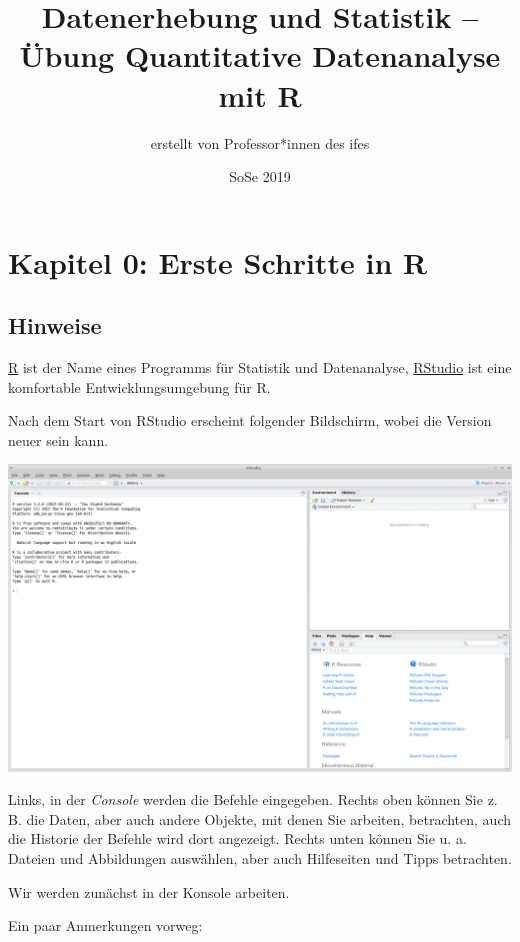 \documentclass[12pt,ngerman,paper=a4,pagesize,DIV=13]{scrreprt}
\title{Datenerhebung und Statistik -- \newline Übung Quantitative Datenanalyse
mit R}
\author{erstellt von Professor*innen des ifes}
\date{SoSe 2019}
\begin{document}
\maketitle

\tableofcontents
\newpage

\hypertarget{kapitel-0-erste-schritte-in-r}{%
\chapter{Kapitel 0: Erste Schritte in
R}\label{kapitel-0-erste-schritte-in-r}}

\hypertarget{hinweise}{%
\section{Hinweise}\label{hinweise}}

\href{https://cran.r-project.org}{R} ist der Name eines Programms für
Statistik und Datenanalyse, \href{https://www.rstudio.com}{RStudio} ist
eine komfortable Entwicklungsumgebung für R.

Nach dem Start von RStudio erscheint folgender Bildschirm, wobei die
Version neuer sein kann.

\begin{center}\includegraphics[width=0.8\linewidth]{Inhalte/images/RStudio-Screenshot-3-4} \end{center}

Links, in der \emph{Console} werden die Befehle eingegeben. Rechts oben
können Sie z. B. die Daten, aber auch andere Objekte, mit denen Sie
arbeiten, betrachten, auch die Historie der Befehle wird dort angezeigt.
Rechts unten können Sie u. a. Dateien und Abbildungen auswählen, aber
auch Hilfeseiten und Tipps betrachten.

Wir werden zunächst in der Konsole arbeiten.

Ein paar Anmerkungen vorweg:
\end{document}
